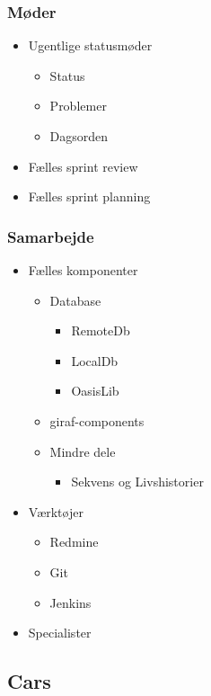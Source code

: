 \begin{frame}
\frametitle{Møder}

\begin{itemize}
\item Ugentlige statusmøder
\begin{itemize}
\item Status
\item Problemer
\item Dagsorden
\end{itemize}
\item Fælles sprint review
\item Fælles sprint planning
\end{itemize}

\end{frame}

\begin{frame}
\frametitle{Samarbejde}

\begin{itemize}
\item Fælles komponenter
\begin{itemize}
\item Database
\begin{itemize}
\item RemoteDb
\item LocalDb
\item OasisLib
\end{itemize}
\item giraf-components
\item Mindre dele
\begin{itemize}
\item Sekvens og Livshistorier
\end{itemize}
\end{itemize}
\item Værktøjer
\begin{itemize}
\item Redmine
\item Git
\item Jenkins
\end{itemize}
\item Specialister
\end{itemize}

\end{frame}

\subsection{Cars}

